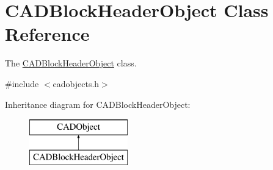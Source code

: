 \hypertarget{class_c_a_d_block_header_object}{}\section{C\+A\+D\+Block\+Header\+Object Class Reference}
\label{class_c_a_d_block_header_object}


The \hyperlink{class_c_a_d_block_header_object}{C\+A\+D\+Block\+Header\+Object} class.  




{\ttfamily \#include $<$cadobjects.\+h$>$}

Inheritance diagram for C\+A\+D\+Block\+Header\+Object\+:\begin{figure}[H]
\begin{center}
\leavevmode
\includegraphics[height=2.000000cm]{class_c_a_d_block_header_object}
\end{center}
\end{figure}
